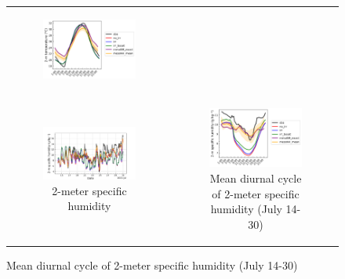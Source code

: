 \begin{figure}[hbtp]
\begin{tabular}{cc}
\begin{subfigure}[t]{0.5\textwidth}
            \includegraphics[width=\textwidth]{images/chap5/SOP_TS_DC/diurnal_cycle_elsplans_t2m.png}
        \end{subfigure} \\
        \begin{subfigure}[t]{0.5\textwidth}
            \caption{2-meter specific humidity }
            \includegraphics[width=\textwidth]{images/chap5/SOP_TS_DC/time_series_elsplans_q2m.png}
        \end{subfigure} &
        \begin{subfigure}[t]{0.5\textwidth}
            \caption{Mean diurnal cycle of 2-meter specific humidity (July 14-30)}
            \includegraphics[width=\textwidth]{images/chap5/SOP_TS_DC/diurnal_cycle_elsplans_q2m.png}

\end{subfigure}
\end{tabular}
\end{figure}
